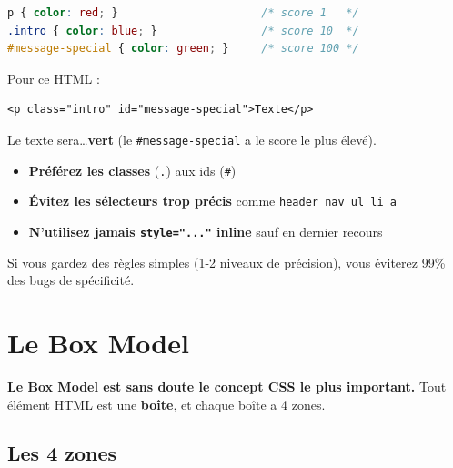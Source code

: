 \documentclass[11pt,a4paper]{article}
\begin{document}
\begin{lstlisting}[language=CSS]
p { color: red; }                      /* score 1   */
.intro { color: blue; }                /* score 10  */
#message-special { color: green; }     /* score 100 */
\end{lstlisting}

Pour ce HTML :
\begin{lstlisting}[language=HTML5]
<p class="intro" id="message-special">Texte</p>
\end{lstlisting}

Le texte sera\ldots \textbf{vert} (le \texttt{\#message-special} a le score
le plus élevé).

\begin{retenirbox}
\begin{itemize}[nosep]
    \item \textbf{Préférez les classes} (\texttt{.}) aux ids (\texttt{\#})
    \item \textbf{Évitez les sélecteurs trop précis} comme \texttt{header nav ul li a}
    \item \textbf{N'utilisez jamais \texttt{style="..."} inline} sauf en dernier recours
\end{itemize}
Si vous gardez des règles simples (1-2 niveaux de précision), vous éviterez
99\% des bugs de spécificité.
\end{retenirbox}

\newpage

\section{Le Box Model}

\textbf{Le Box Model est sans doute le concept CSS le plus important.}
Tout élément HTML est une \textbf{boîte}, et chaque boîte a 4 zones.

\subsection{Les 4 zones}
\end{document}
